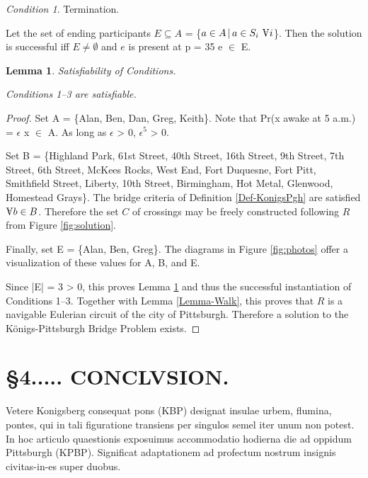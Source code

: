 \documentclass[twocolumn]{article}
\renewcommand\forall{\raisebox{\depth}{\rotatebox{180}{A}}}
\theoremstyle{plain}  %
\newtheorem{lemma}{Lemma}
\theoremstyle{definition}  %
\theoremstyle{remark}  %
\newtheorem{cond}{Condition}
\begin{document}
\begin{cond}
	\label{cond:term}
Termination.

Let the set of ending participants $E \subseteq A$ = \{$a \in A\,|\, a \in S_i\ \forall{}i$\}.  Then the solution is successful iff $E \neq \emptyset$ and $e$ is present at p = 35 \forall{}e $\in$ E.
\end{cond}

\begin{lemma}
Satisfiability of Conditions.

Conditions 1--3 are satisfiable.
\label{lem:satisf}

\end{lemma}
\begin{proof}
	Set A = \{Alan, Ben, Dan, Greg, Keith\}. Note that Pr(x  awake at 5 a.m.) = $\epsilon$ \forall{}x $\in$ A. As long as $\epsilon$ > 0, $\epsilon^5$ > 0. \cite{what-is-epsilon}

Set B = \{Highland Park, 61st Street, 40th Street, 16th Street, 9th Street, 7th Street, 6th Street, McKees Rocks, West End, Fort Duquesne, Fort Pitt, Smithfield Street, Liberty, 10th Street, Birmingham, Hot Metal, Glenwood, Homestead Grays\}.
The bridge criteria of Definition \ref{Def-KonigsPgh} are satisfied $\forall{}b \in B$. Therefore the set $C$ of crossings may be freely constructed following $R$ from Figure \ref{fig:solution}.

Finally, set E = \{Alan, Ben, Greg\}.
The diagrams in Figure \ref{fig:photos} offer a visualization of these values for A, B, and E.

Since |E| = 3 > 0, this proves Lemma \ref{lem:satisf} and thus the successful instantiation of Conditions 1--3.  Together with Lemma \ref{Lemma-Walk}, this proves that $R$ is a navigable Eulerian circuit of the city of Pittsburgh.  Therefore a solution to the K\"onigs-Pittsburgh Bridge Problem exists.
\end{proof}

\section*{\S 4..... CONCLVSION.}


Vetere Konigsberg consequat pons (KBP) designat insulae urbem, flumina, pontes, qui in tali figuratione transiens per singulos semel iter unum non potest.
In hoc articulo quaestionis exposuimus accommodatio hodierna die ad oppidum Pittsburgh (KPBP).
Significat adaptationem ad profectum nostrum insignis civitas-in-es super duobus.
\end{document}
